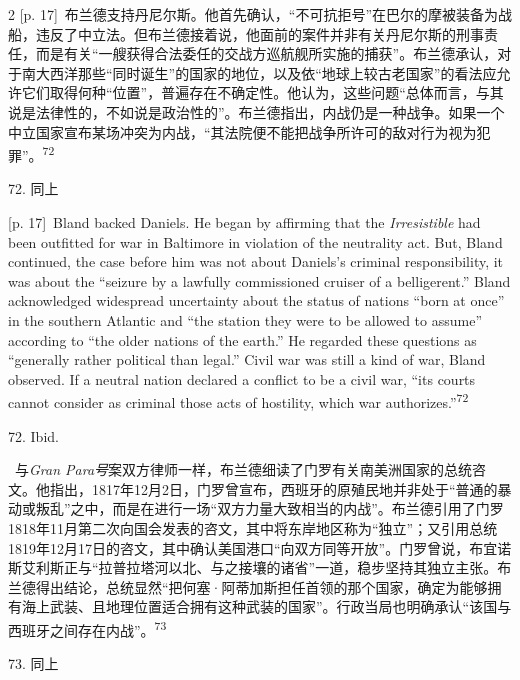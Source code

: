 \documentclass[10pt,a4paper]{article}
\begin{document}
\begin{paracol}{2}
{\scriptsize\color{gray} [p. 17]}\ 布兰德支持丹尼尔斯。他首先确认，“不可抗拒号”在巴尔的摩被装备为战船，违反了中立法。但布兰德接着说，他面前的案件并非有关丹尼尔斯的刑事责任，而是有关“一艘获得合法委任的交战方巡航舰所实施的捕获”。布兰德承认，对于南大西洋那些“同时诞生”的国家的地位，以及依“地球上较古老国家”的看法应允许它们取得何种“位置”，普遍存在不确定性。他认为，这些问题“总体而言，与其说是法律性的，不如说是政治性的”。布兰德指出，内战仍是一种战争。如果一个中立国家宣布某场冲突为内战，“其法院便不能把战争所许可的敌对行为视为犯罪”。\nobreak\textsuperscript{72}\par{\small 72. 同上\par}
\switchcolumn
{\scriptsize\color{gray} [p. 17]}\ Bland backed Daniels. He began by affirming that the \textit{Irresistible} had been outfitted for war in Baltimore in violation of the neutrality act. But, Bland continued, the case before him was not about Daniels’s criminal responsibility, it was about the “seizure by a lawfully commissioned cruiser of a belligerent.” Bland acknowledged widespread uncertainty about the status of nations “born at once” in the southern Atlantic and “the station they were to be allowed to assume” according to “the older nations of the earth.” He regarded these questions as “generally rather political than legal.” Civil war was still a kind of war, Bland observed. If a neutral nation declared a conflict to be a civil war, “its courts cannot consider as criminal those acts of hostility, which war authorizes.”\nobreak\textsuperscript{72}\par{\small 72. Ibid.\par}
\switchcolumn*
{\scriptsize\color{gray} [p. 18]}\ 与\textit{Gran Para号}案双方律师一样，布兰德细读了门罗有关南美洲国家的总统咨文。他指出，1817年12月2日，门罗曾宣布，西班牙的原殖民地并非处于“普通的暴动或叛乱”之中，而是在进行一场“双方力量大致相当的内战”。布兰德引用了门罗1818年11月第二次向国会发表的咨文，其中将东岸地区称为“独立”；又引用总统1819年12月17日的咨文，其中确认美国港口“向双方同等开放”。门罗曾说，布宜诺斯艾利斯正与“拉普拉塔河以北、与之接壤的诸省”一道，稳步坚持其独立主张。布兰德得出结论，总统显然“把何塞·阿蒂加斯担任首领的那个国家，确定为能够拥有海上武装、且地理位置适合拥有这种武装的国家”。行政当局也明确承认“该国与西班牙之间存在内战”。\nobreak\textsuperscript{73}\par{\small 73. 同上\par}
\switchcolumn

\end{paracol}
\end{document}
